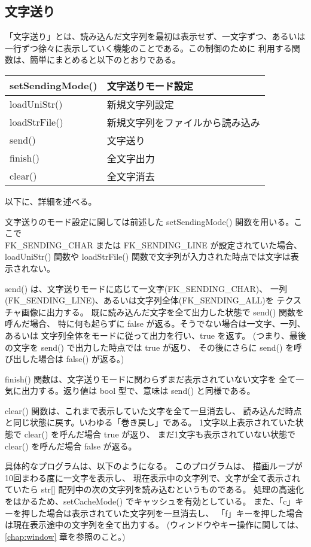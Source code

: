\subsection{文字送り} \label{subsec:textSending}
「文字送り」とは、読み込んだ文字列を最初は表示せず、一文字ずつ、あるいは
一行ずつ徐々に表示していく機能のことである。この制御のために
利用する関数は、簡単にまとめると以下のとおりである。
\begin{center}
\begin{tabular}{|l|l|}
\hline
setSendingMode() & 文字送りモード設定 \\ \hline
loadUniStr() & 新規文字列設定 \\ \hline
loadStrFile() & 新規文字列をファイルから読み込み \\ \hline
send() & 文字送り \\ \hline
finish() & 全文字出力 \\ \hline
clear() & 全文字消去 \\ \hline
\end{tabular}
\end{center}
以下に、詳細を述べる。

文字送りのモード設定に関しては前述した setSendingMode() 関数を用いる。ここで \\
FK\_SENDING\_CHAR または
FK\_SENDING\_LINE が設定されていた場合、loadUniStr() 関数や
loadStrFile() 関数で文字列が入力された時点では文字は表示されない。

send() は、文字送りモードに応じて一文字(FK\_SENDING\_CHAR)、
一列(FK\_SENDING\_LINE)、あるいは文字列全体(FK\_SENDING\_ALL)を
テクスチャ画像に出力する。
既に読み込んだ文字を全て出力した状態で send() 関数を呼んだ場合、
特に何も起らずに false が返る。そうでない場合は一文字、一列、あるいは
文字列全体をモードに従って出力を行い、true を返す。
(つまり、最後の文字を send() で出力した時点では true が返り、
その後にさらに send() を呼び出した場合は false() が返る。)

finish() 関数は、文字送りモードに関わらずまだ表示されていない文字を
全て一気に出力する。返り値は bool 型で、意味は send() と同様である。

clear() 関数は、これまで表示していた文字を全て一旦消去し、
読み込んだ時点と同じ状態に戻す。いわゆる「巻き戻し」である。
1文字以上表示されていた状態で clear() を呼んだ場合 true が返り、
まだ1文字も表示されていない状態で clear() を呼んだ場合 false が返る。

具体的なプログラムは、以下のようになる。
このプログラムは、
描画ループが10回まわる度に一文字を表示し、
現在表示中の文字列で、文字が全て表示されていたら
str[] 配列中の次の文字列を読み込むというものである。
処理の高速化をはかるため、setCacheMode() でキャッシュを有効としている。
また、「c」キーを押した場合は表示されていた文字列を一旦消去し、
「f」キーを押した場合は現在表示途中の文字列を全て出力する。
(ウィンドウやキー操作に関しては、\ref{chap:window} 章を参照のこと。) \\

